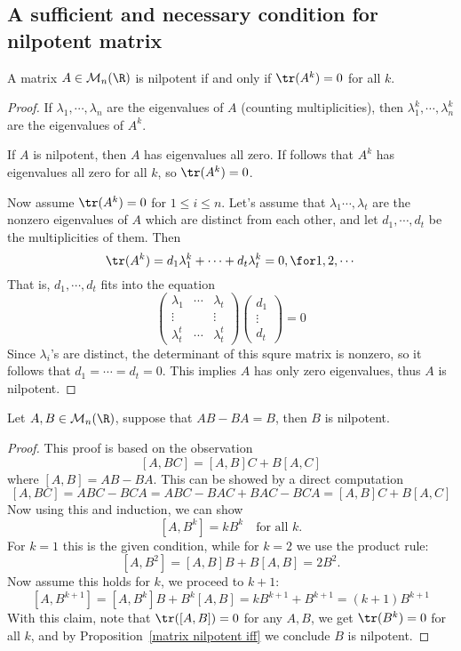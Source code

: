 \subsection{A sufficient and necessary condition for nilpotent matrix}
\begin{proposition}\label{matrix nilpotent iff}
A matrix $A\in\mathcal{M}_{n}(\R)$ is nilpotent if and only if $\tr(A^k)=0$ for all $k$.
\end{proposition}
\begin{proof}
If $\lambda_1,\cdots,\lambda_n$ are the eigenvalues of $A$ (counting multiplicities), then $\lambda_1^k,\cdots,\lambda_n^k$ are the eigenvalues of $A^k$.\par
If $A$ is nilpotent, then $A$ has eigenvalues all zero. If follows that $A^k$ has eigenvalues all zero for all $k$, so $\tr(A^k)=0$.\par
Now assume $\tr(A^k)=0$ for $1\leq i\leq n$. Let's assume that $\lambda_1\cdots,\lambda_t$ are the nonzero eigenvalues of $A$ which are distinct from each other, and let $d_1,\cdots,d_t$ be the multiplicities of them. Then
\[\tr(A^k)=d_1\lambda_1^k+\cdots+d_t\lambda_t^k=0,\for 1,2,\cdots\]
That is, $d_1,\cdots,d_t$ fits into the equation
\[\begin{pmatrix}
\lambda_1&\cdots&\lambda_t\\
\vdots&&\vdots\\
\lambda_t^t&\cdots&\lambda^t_t
\end{pmatrix}\begin{pmatrix}
d_1\\
\vdots\\
d_t
\end{pmatrix}=0\]
Since $\lambda_i$'s are distinct, the determinant of this squre matrix is nonzero, so it follows that $d_1=\cdots=d_t=0$. This implies $A$ has only zero eigenvalues, thus $A$ is nilpotent.
\end{proof}
\begin{corollary}
Let $A,B\in\mathcal{M}_n(\R)$, suppose that $AB-BA=B$, then $B$ is nilpotent.
\end{corollary}
\begin{proof}
This proof is based on the observation
\[[A,BC]=[A,B]C+B[A,C]\]
where $[A,B]=AB-BA$. This can be showed by a direct computation
\[[A,BC]=ABC-BCA=ABC-BAC+BAC-BCA=[A,B]C+B[A,C]\]
Now using this and induction, we can show
\[[A,B^k]=kB^{k}\quad\text{for all }k.\]
For $k=1$ this is the given condition, while for $k=2$ we use the product rule:
\[[A,B^2]=[A,B]B+B[A,B]=2B^2.\]
Now assume this holds for $k$, we proceed to $k+1$:
\[[A,B^{k+1}]=[A,B^k]B+B^k[A,B]=kB^{k+1}+B^{k+1}=(k+1)B^{k+1}\]
With this claim, note that $\tr([A,B])=0$ for any $A,B$, we get $\tr(B^k)=0$ for all $k$, and by Proposition~\ref{matrix nilpotent iff} we conclude $B$ is nilpotent.
\end{proof}
